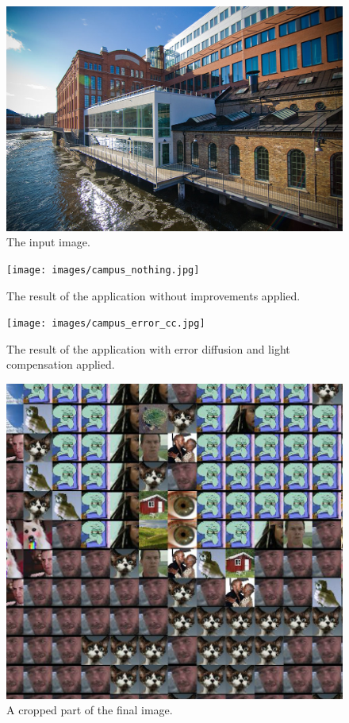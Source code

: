 \documentclass[conference]{IEEEtran}
\begin{document}
\begin{figure}
  \centering
    \includegraphics[width=0.9\linewidth]{images/campus_mellan.jpg}
    \caption{\label{fig:input} The input image.}
\end{figure}

\begin{figure}
  \centering
    \texttt{[image: images/campus\_nothing.jpg]}
    \caption{\label{fig:nothing} The result of the application without improvements applied.}
\end{figure}

\begin{figure}
  \centering
    \texttt{[image: images/campus\_error\_cc.jpg]}
    \caption{\label{fig:final} The result of the application with error diffusion and light compensation applied.}
\end{figure}

\begin{figure}
  \centering
    \includegraphics[width=0.7\linewidth]{images/closeup}
    \caption{\label{fig:cropped} A cropped part of the final image.}
\end{figure}
\end{document}
